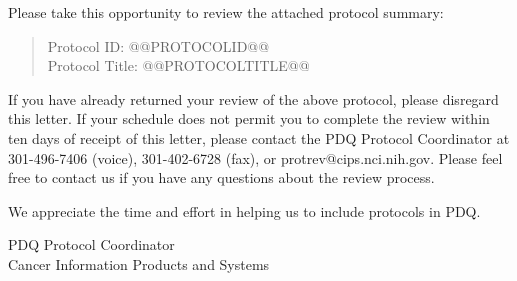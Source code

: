 \documentclass[letterpaper,12pt]{letter}
\begin{document}
Please take this opportunity to review the attached protocol summary:

\begin{verse}

Protocol ID: @@PROTOCOLID@@ \\
Protocol Title: @@PROTOCOLTITLE@@

\end{verse}

If you have already returned your review of the above protocol, please
disregard this letter.  If your schedule does not permit you to complete 
the review within ten days of receipt of this letter, please contact
the PDQ Protocol Coordinator at 301-496-7406 (voice), 301-402-6728 (fax),
or protrev@cips.nci.nih.gov.  Please feel free to contact us if you 
have any questions about the review process.

We appreciate the time and effort in helping us to include protocols
in PDQ.

\vspace{12pt}

PDQ Protocol Coordinator \\
Cancer Information Products and Systems

\vfill
\end{document}
